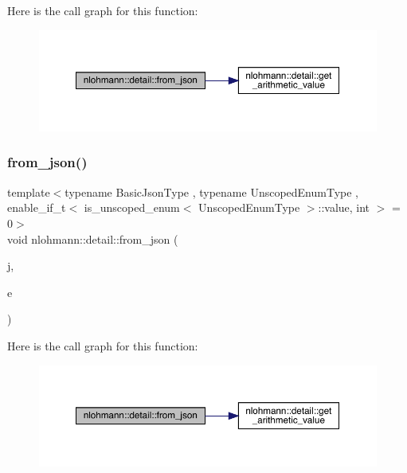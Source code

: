 Here is the call graph for this function\+:\nopagebreak
\begin{figure}[H]
\begin{center}
\leavevmode
\includegraphics[width=350pt]{namespacenlohmann_1_1detail_a047d881e611fcac709dc318f730a1732_cgraph}
\end{center}
\end{figure}
\mbox{\label{namespacenlohmann_1_1detail_acf8dd944c2c7455880dee6f0b355aa01}} 
\subsubsection{\texorpdfstring{from\_json()}{from\_json()}\hspace{0.1cm}{\footnotesize\ttfamily [6/11]}}
{\footnotesize\ttfamily template$<$typename Basic\+Json\+Type , typename Unscoped\+Enum\+Type , enable\+\_\+if\+\_\+t$<$ is\+\_\+unscoped\+\_\+enum$<$ Unscoped\+Enum\+Type $>$\+::value, int $>$  = 0$>$ \\
void nlohmann\+::detail\+::from\+\_\+json (\begin{DoxyParamCaption}\item[{const Basic\+Json\+Type \&}]{j,  }\item[{Unscoped\+Enum\+Type \&}]{e }\end{DoxyParamCaption})}

Here is the call graph for this function\+:\nopagebreak
\begin{figure}[H]
\begin{center}
\leavevmode
\includegraphics[width=350pt]{namespacenlohmann_1_1detail_acf8dd944c2c7455880dee6f0b355aa01_cgraph}
\end{center}
\end{figure}
\mbox{\label{namespacenlohmann_1_1detail_abc62958462b916726b89f25fa381a129}} 
